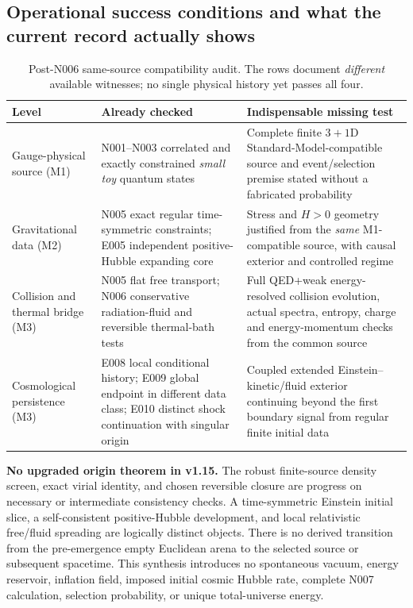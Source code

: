 \documentclass[11pt,a4paper]{article}
\theoremstyle{tmon}
\theoremstyle{definition}
\begin{document}
\subsection{Operational success conditions and what the current record actually shows}
\begin{table}[htbp]\centering\footnotesize\renewcommand{\arraystretch}{1.08}
\begin{tabularx}{\linewidth}{@{}p{.22\linewidth}YY@{}}\toprule
\textbf{Level} & \textbf{Already checked} & \textbf{Indispensable missing test}\\\midrule
Gauge-physical source (M1) & N001--N003 correlated and exactly constrained \emph{small toy} quantum states & Complete finite $3+1$D Standard-Model-compatible source and event/selection premise stated without a fabricated probability\\
Gravitational data (M2) & N005 exact regular time-symmetric constraints; E005 independent positive-Hubble expanding core & Stress and $H>0$ geometry justified from the \emph{same} M1-compatible source, with causal exterior and controlled regime\\
Collision and thermal bridge (M3) & N005 flat free transport; N006 conservative radiation-fluid and reversible thermal-bath tests & Full QED+weak energy-resolved collision evolution, actual spectra, entropy, charge and energy-momentum checks from the common source\\
Cosmological persistence (M3) & E008 local conditional history; E009 global endpoint in different data class; E010 distinct shock continuation with singular origin & Coupled extended Einstein--kinetic/fluid exterior continuing beyond the first boundary signal from regular finite initial data\\\bottomrule
\end{tabularx}
\caption{Post-N006 same-source compatibility audit. The rows document \emph{different} available witnesses; no single physical history yet passes all four.}\label{tab:n006audit}
\end{table}

\begin{warningbox}
\textbf{No upgraded origin theorem in v1.15.} The robust finite-source density screen, exact virial identity, and chosen reversible closure are progress on necessary or intermediate consistency checks. A time-symmetric Einstein initial slice, a self-consistent positive-Hubble development, and local relativistic free/fluid spreading are logically distinct objects. There is no derived transition from the pre-emergence empty Euclidean arena to the selected source or subsequent spacetime. This synthesis introduces no spontaneous vacuum, energy reservoir, inflation field, imposed initial cosmic Hubble rate, complete N007 calculation, selection probability, or unique total-universe energy.
\end{warningbox}
\end{document}
